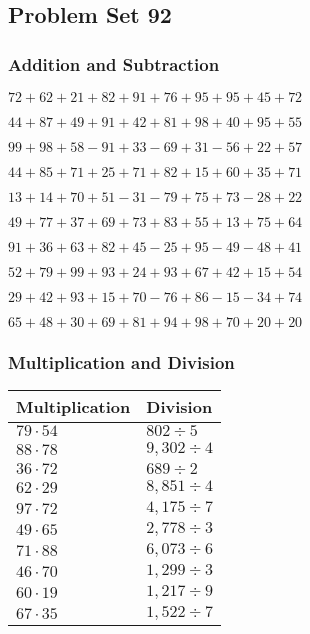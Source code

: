 \hypertarget{problem-set-92}{%
\subsection{Problem Set 92}\label{problem-set-92}}

\hypertarget{addition-and-subtraction}{%
\subsubsection{Addition and
Subtraction}\label{addition-and-subtraction}}

\(72+62+21+82+91+76+95+95+45+72\)

\(44+87+49+91+42+81+98+40+95+55\)

\(99+98+58-91+33-69+31-56+22+57\)

\(44+85+71+25+71+82+15+60+35+71\)

\(13+14+70+51-31-79+75+73-28+22\)

\(49+77+37+69+73+83+55+13+75+64\)

\(91+36+63+82+45-25+95-49-48+41\)

\(52+79+99+93+24+93+67+42+15+54\)

\(29+42+93+15+70-76+86-15-34+74\)

\(65+48+30+69+81+94+98+70+20+20\)

\hypertarget{multiplication-and-division}{%
\subsubsection{Multiplication and
Division}\label{multiplication-and-division}}

\begin{longtable}[]{@{}ll@{}}
\toprule
Multiplication & Division\tabularnewline
\midrule
\endhead
\(79\cdot54\) & \(802÷5\)\tabularnewline
\(88\cdot78\) & \(9,302÷4\)\tabularnewline
\(36\cdot72\) & \(689÷2\)\tabularnewline
\(62\cdot29\) & \(8,851÷4\)\tabularnewline
\(97\cdot72\) & \(4,175÷7\)\tabularnewline
\(49\cdot65\) & \(2,778÷3\)\tabularnewline
\(71\cdot88\) & \(6,073÷6\)\tabularnewline
\(46\cdot70\) & \(1,299÷3\)\tabularnewline
\(60\cdot19\) & \(1,217 ÷9\)\tabularnewline
\(67\cdot35\) & \(1,522÷7\)\tabularnewline
\bottomrule
\end{longtable}
